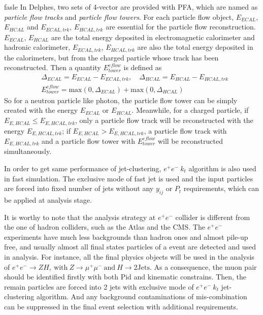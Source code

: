 \documentclass[a4paper,10pt,twoside]{cpc-hepnp}
\begin{document}
\begin{multicols}{2}
\if fasle
In Delphes, two sets of 4-vector are provided with PFA, which are named as {\it{particle flow tracks}} and {\it{particle flow towers}}.
For each particle flow object, $E_{ECAL}$, $E_{HCAL}$ and $E_{ECAL, trk}$, $E_{HCAL, trk}$ are essential for the particle flow reconstruction.
$E_{ECAL}$, $E_{HCAL}$ are the total energy deposited in electromagnetic calorimeter and hadronic calorimeter,
$E_{ECAL, trk}$, $E_{HCAL, trk}$ are also the total energy deposited in the calorimeters,
but from the charged particle whose track has been reconstructed. Then a quantity $E^{eflow}_{tower}$ is defined as
\begin{eqnarray}
&\Delta_{ECAL}=E_{ECAL}-E_{ECAL, trk}, \quad\Delta_{HCAL}=E_{HCAL}-E_{HCAL, trk}\\
&E^{eflow}_{tower}=\mathrm{max}(0,\Delta_{ECAL})+\mathrm{max}(0,\Delta_{HCAL})
\end{eqnarray}
So for a neutron particle like photon, the particle flow tower can be simply created with the energy $E_{ECAL}$ or $E_{HCAL}$. Meanwhile, for a charged particle,  if $E_{E,HCAL}\le E_{E,HCAL,trk}$, only a particle flow track will be reconstructed with the energy $E_{E,HCAL,trk}$; if $E_{E,HCAL}>E_{E,HCAL,trk}$, a particle flow track with $E_{E,HCAL,trk}$ and a particle flow tower with $E^{eflow}_{tower}$ will be reconstructed simultaneously.
\fi

In order to get same performance of jet-clustering, $e^+e^-~k_t$ algorithm is also used in fast simulation.
The exclusive mode of fast jet is used and the input particles are forced into fixed number of jets
without any $y_{ij}$ or $P_t$ requirements, which can be applied at analysis stage.

It is worthy to note that the analysis strategy at $e^+e^-$ collider is different from the one of hadron colliders,
such as the Atlas and the CMS.  The $e^+e^-$ experiments have much less backgrounds than hadron ones and almost pile-up free,
and usually almost all final states particles of a event are detected and used in analysis.
For instance, all the final physics objects will be used in the analysis of
$e^+e^- \to ZH,~\mbox{with}~Z \to\mu^+\mu^-~\mbox{and}~H \to 2\mbox{Jets} $.
As a consequence, the muon pair should be identified firstly with both Pid and kinematic constrains.
Then, the remain particles are forced into 2 jets with exclusive mode of $e^+e^-~k_t$ jet-clustering algorithm.
And any background contaminations of mis-combination can be suppressed in the final event selection with additional requirements.



\end{multicols}
\end{document}
